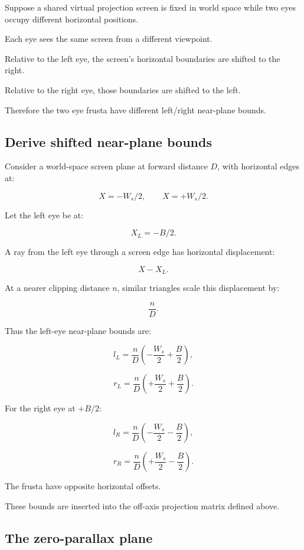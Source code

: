 Suppose a shared virtual projection screen is fixed in world space while two eyes occupy different horizontal positions.

Each eye sees the same screen from a different viewpoint.

Relative to the left eye, the screen's horizontal boundaries are shifted to the right.

Relative to the right eye, those boundaries are shifted to the left.

Therefore the two eye frusta have different left/right near-plane bounds.

\subsection{Derive shifted near-plane bounds}\label{02-foundations-ii-ch035-derive-shifted-near-plane-bounds}

Consider a world-space screen plane at forward distance \(D\), with horizontal edges at:

\[ X=-W_s/2,\qquad X=+W_s/2. \]

Let the left eye be at:

\[ X_L=-B/2. \]

A ray from the left eye through a screen edge has horizontal displacement:

\[ X-X_L. \]

At a nearer clipping distance \(n\), similar triangles scale this displacement by:

\[ \frac nD. \]

Thus the left-eye near-plane bounds are:

\[ \boxed{ l_L=\frac nD\left(-\frac{W_s}{2}+\frac B2\right), } \]

\[ \boxed{ r_L=\frac nD\left(+\frac{W_s}{2}+\frac B2\right). } \]

For the right eye at \(+B/2\):

\[ \boxed{ l_R=\frac nD\left(-\frac{W_s}{2}-\frac B2\right), } \]

\[ \boxed{ r_R=\frac nD\left(+\frac{W_s}{2}-\frac B2\right). } \]

The frusta have opposite horizontal offsets.

These bounds are inserted into the off-axis projection matrix defined above.

\subsection{The zero-parallax plane}\label{02-foundations-ii-ch035-the-zero-parallax-plane}

